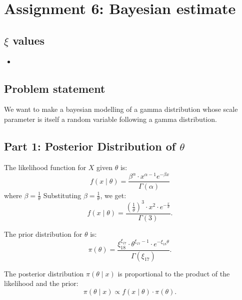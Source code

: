 \chapter{Assignment 6: Bayesian estimate}

\section*{$\xi$ values}

\begin{itemize}
\item 
\end{itemize}

\section{Problem statement}

We want to make a bayesian modelling of a gamma distribution whose scale parameter is itself a random variable following a gamma distribution.



\section*{Part 1: Posterior Distribution of $\theta$}

The likelihood function for $X$ given $\theta$ is:
\begin{equation}
f(x \mid \theta) = \frac{\beta^\alpha \cdot x^{\alpha-1} e^{-\beta x}}{\Gamma(\alpha)}
\end{equation}
where $\beta = \frac{1}{\theta}$
Substituting $\beta = \frac{1}{\theta}$, we get:
\begin{equation}
f(x \mid \theta) = \frac{\left(\frac{1}{\theta}\right)^3 \cdot x^2 \cdot e^{-\frac{x}{\theta}}}{\Gamma(3)}.
\end{equation}

The prior distribution for $\theta$ is:
\begin{equation}
\pi(\theta) = \frac{\xi_{18}^{\xi_{17}} \cdot \theta^{\xi_{17}-1} \cdot e^{-\xi_{18} \theta}}{\Gamma(\xi_{17})}.
\end{equation}

The posterior distribution $\pi(\theta \mid x)$ is proportional to the product of the likelihood and the prior:
\begin{equation}
\pi(\theta \mid x) \propto f(x \mid \theta) \cdot \pi(\theta).
\end{equation}

